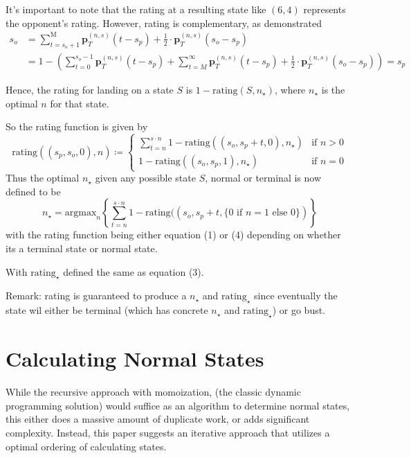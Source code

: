 \documentclass[a4paper]{article}
\begin{document}
It's important to note that the rating at a resulting state like $(6, 4)$ represents the opponent's rating. However, rating is complementary, as demonstrated
%
\begin{align*}
s_o &= \sum_{t = s_o+1}^{\text{M}} \textbf{p}_{T}^{(n, s)}(t - s_p) + \frac{1}{2} \cdot \textbf{p}_{T}^{(n, s)}(s_o - s_p) \\
&= 1 - \left(\sum_{t = 0}^{s_o - 1} \textbf{p}_{T}^{(n, s)}(t - s_p) + \sum_{t = M}^{\infty} \textbf{p}_{T}^{(n, s)}(t - s_p)  + \frac{1}{2} \cdot \textbf{p}_{T}^{(n, s)}(s_o - s_p)\right) = s_p
\end{align*}

Hence, the rating for landing on a state $S$ is $1-\text{rating}(S, n_{\star})$, where $n_{\star}$ is the optimal $n$ for that state. 

So the rating function is given by
%
\begin{equation}
    \text{rating}((s_p, s_o, 0), n) \coloneqq \begin{cases}
        \sum_{t = n}^{s \cdot n} 1 - \text{rating}((s_o, s_p + t, 0), n_{\star}) & \text{if } n > 0 \\
        1- \text{rating}((s_o, s_p, 1), n_{\star}) & \text{if } n = 0
    \end{cases}
\end{equation}
%
Thus the optimal $n_{\star}$ given any possible state $S$, normal or terminal is now defined to be
%
$$
n_{\star} = \text{argmax}_{n} \left\{\sum_{t = n}^{s \cdot n} 1 - \text{rating}((s_o, s_p + t, \{0 \text{ if } n = 1 \text{ else } 0\}) \right\}
$$
%
with the rating function being either equation (1) or (4) depending on whether its a terminal state or normal state.

With $\text{rating}_{\star}$ defined the same as equation (3).

Remark: rating is guaranteed to produce a $n_{\star}$ and $\text{rating}_{\star}$ since eventually the state wil either be terminal (which has concrete $n_{\star}$ and $\text{rating}_{\star}$) or go bust.


\section{Calculating Normal States}

While the recursive approach with momoization, (the classic dynamic programming solution) would suffice as an algorithm to determine normal states, this either does a massive amount of duplicate work, or adds significant complexity. Instead, this paper suggests an iterative approach that utilizes a optimal ordering of calculating states.  
\end{document}
